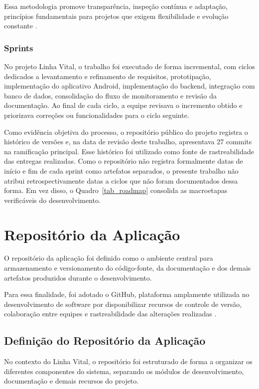 Essa metodologia promove transparência, inspeção contínua e adaptação, princípios fundamentais para projetos que exigem flexibilidade e evolução constante \cite{scrumguide2020}.

\subsubsection{Sprints}

No projeto Linha Vital, o trabalho foi executado de forma incremental, com ciclos dedicados a levantamento e refinamento de requisitos, prototipação, implementação do aplicativo Android, implementação do backend, integração com banco de dados, consolidação do fluxo de monitoramento e revisão da documentação. Ao final de cada ciclo, a equipe revisava o incremento obtido e priorizava correções ou funcionalidades para o ciclo seguinte.

Como evidência objetiva do processo, o repositório público do projeto registra o histórico de versões e, na data de revisão deste trabalho, apresentava 27 commits na ramificação principal. Esse histórico foi utilizado como fonte de rastreabilidade das entregas realizadas. Como o repositório não registra formalmente datas de início e fim de cada sprint como artefatos separados, o presente trabalho não atribui retrospectivamente datas a ciclos que não foram documentados dessa forma. Em vez disso, o Quadro~\ref{tab_roadmap} consolida as macroetapas verificáveis do desenvolvimento.

\section{Repositório da Aplicação}

O repositório da aplicação foi definido como o ambiente central para armazenamento e versionamento do código-fonte, da documentação e dos demais artefatos produzidos durante o desenvolvimento.

Para essa finalidade, foi adotado o GitHub, plataforma amplamente utilizada no desenvolvimento de software por disponibilizar recursos de controle de versão, colaboração entre equipes e rastreabilidade das alterações realizadas \cite{progit2014, githubdocs2026}.

\subsection{Definição do Repositório da Aplicação}

No contexto do Linha Vital, o repositório foi estruturado de forma a organizar os diferentes componentes do sistema, separando os módulos de desenvolvimento, documentação e demais recursos do projeto.

